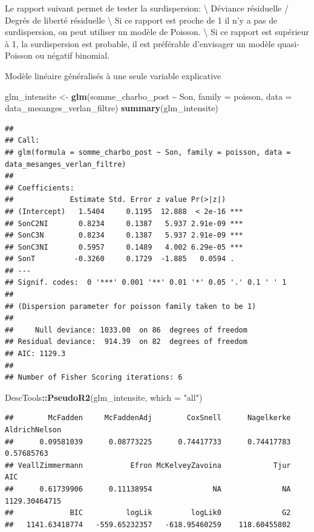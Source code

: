 \documentclass[
  french,
]{article}
\newenvironment{Shaded}{\begin{snugshade}}{\end{snugshade}}
\newcommand{\AttributeTok}[1]{\textcolor[rgb]{0.13,0.29,0.53}{#1}}
\newcommand{\FunctionTok}[1]{\textcolor[rgb]{0.13,0.29,0.53}{\textbf{#1}}}
\newcommand{\NormalTok}[1]{#1}
\newcommand{\OtherTok}[1]{\textcolor[rgb]{0.56,0.35,0.01}{#1}}
\newcommand{\SpecialCharTok}[1]{\textcolor[rgb]{0.81,0.36,0.00}{\textbf{#1}}}
\newcommand{\StringTok}[1]{\textcolor[rgb]{0.31,0.60,0.02}{#1}}
\begin{document}
Le rapport suivant permet de tester la surdispersion: \textbackslash{}
Déviance résiduelle / Degrés de liberté résiduelle \textbackslash{} Si
ce rapport est proche de 1 il n'y a pas de surdispersion, on peut
utiliser un modèle de Poisson. \textbackslash{} Si ce rapport est
supérieur à 1, la surdispersion est probable, il est préférable
d'envisager un modèle quasi-Poisson ou négatif binomial.

Modèle linéaire généralisés à une seule variable explicative

\begin{Shaded}
\begin{Highlighting}[]
\NormalTok{glm\_intensite }\OtherTok{\textless{}{-}} \FunctionTok{glm}\NormalTok{(somme\_charbo\_post }\SpecialCharTok{\textasciitilde{}}\NormalTok{ Son,}
                     \AttributeTok{family =}\NormalTok{ poisson,}
                     \AttributeTok{data =}\NormalTok{ data\_mesanges\_verlan\_filtre)}
\FunctionTok{summary}\NormalTok{(glm\_intensite)}
\end{Highlighting}
\end{Shaded}

\begin{verbatim}
## 
## Call:
## glm(formula = somme_charbo_post ~ Son, family = poisson, data = data_mesanges_verlan_filtre)
## 
## Coefficients:
##             Estimate Std. Error z value Pr(>|z|)    
## (Intercept)   1.5404     0.1195  12.888  < 2e-16 ***
## SonC2NI       0.8234     0.1387   5.937 2.91e-09 ***
## SonC3N        0.8234     0.1387   5.937 2.91e-09 ***
## SonC3NI       0.5957     0.1489   4.002 6.29e-05 ***
## SonT         -0.3260     0.1729  -1.885   0.0594 .  
## ---
## Signif. codes:  0 '***' 0.001 '**' 0.01 '*' 0.05 '.' 0.1 ' ' 1
## 
## (Dispersion parameter for poisson family taken to be 1)
## 
##     Null deviance: 1033.00  on 86  degrees of freedom
## Residual deviance:  914.39  on 82  degrees of freedom
## AIC: 1129.3
## 
## Number of Fisher Scoring iterations: 6
\end{verbatim}

\begin{Shaded}
\begin{Highlighting}[]
\NormalTok{DescTools}\SpecialCharTok{::}\FunctionTok{PseudoR2}\NormalTok{(glm\_intensite, }\AttributeTok{which =} \StringTok{"all"}\NormalTok{)}
\end{Highlighting}
\end{Shaded}

\begin{verbatim}
##        McFadden     McFaddenAdj        CoxSnell      Nagelkerke   AldrichNelson 
##      0.09581039      0.08773225      0.74417733      0.74417783      0.57685763 
## VeallZimmermann           Efron McKelveyZavoina            Tjur             AIC 
##      0.61739906      0.11138954              NA              NA   1129.30464715 
##             BIC          logLik         logLik0              G2 
##   1141.63418774   -559.65232357   -618.95460259    118.60455802
\end{verbatim}
\end{document}

